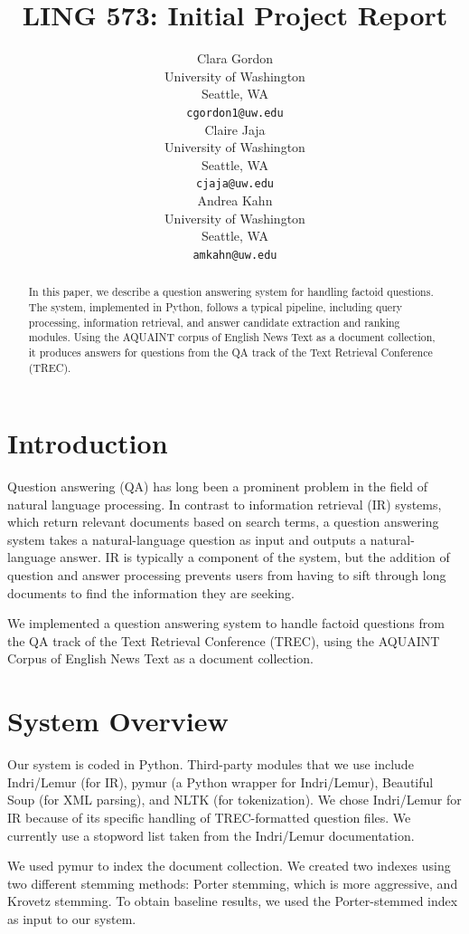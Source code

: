 \documentclass[11pt]{article}
\title{LING 573: Initial Project Report}
\author{Clara Gordon \\
  University of Washington \\
  Seattle, WA \\
  {\tt cgordon1@uw.edu} \\\And
  Claire Jaja \\
  University of Washington \\
  Seattle, WA \\
  {\tt cjaja@uw.edu} \\\And
  Andrea Kahn \\
  University of Washington \\
  Seattle, WA \\
  {\tt amkahn@uw.edu} \\}
\date{}
\begin{document}
\maketitle
\begin{abstract}

In this paper, we describe a question answering system for handling factoid questions.  The system, implemented in Python, follows a typical pipeline, including query processing, information retrieval, and answer candidate extraction and ranking modules. Using the AQUAINT corpus of English News Text as a document collection, it produces answers for questions from the QA track of the Text Retrieval Conference (TREC).

\end{abstract}

\section{Introduction}

Question answering (QA) has long been a prominent problem in the field of natural language processing. In contrast to information retrieval (IR) systems, which return relevant documents based on search terms, a question answering system takes a natural-language question as input and outputs a natural-language answer. IR is typically a component of the system, but the addition of question and answer processing prevents users from having to sift through long documents to find the information they are seeking.

We implemented a question answering system to handle factoid questions from the QA track of the Text Retrieval Conference (TREC), using the AQUAINT Corpus of English News Text as a document collection.

\section{System Overview}

Our system is coded in Python. Third-party modules that we use include Indri/Lemur (for IR), pymur (a Python wrapper for Indri/Lemur), Beautiful Soup (for XML parsing), and NLTK (for tokenization). We chose Indri/Lemur for IR because of its specific handling of TREC-formatted question files. We currently use a stopword list taken from the Indri/Lemur documentation.

We used pymur to index the document collection. We created two indexes using two different stemming methods: Porter stemming, which is more aggressive, and Krovetz stemming. To obtain baseline results, we used the Porter-stemmed index as input to our system.
\end{document}
